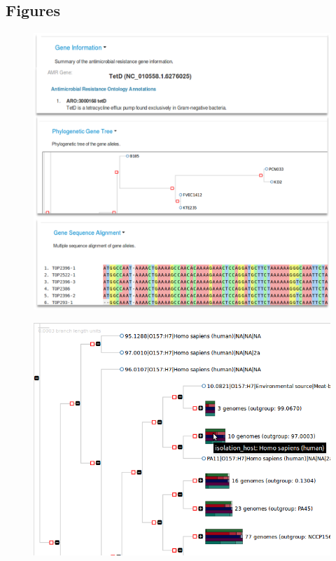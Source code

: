 \documentclass[doublespacing, linenumbers]{bmcart}
\begin{document}
\begin{backmatter}

\section*{Figures}
\begin{figure}[h!]
    \caption{}
    \includegraphics[width=0.9\columnwidth]{images/msa.png}
    \label{fig:msa}
\end{figure}

\begin{figure}[h!]
   \caption{}
   \includegraphics[width=0.9\columnwidth]{images/superphy_tree_tooltip.png}
   \label{fig:tooltip}
\end{figure}


\end{backmatter}
\end{document}
